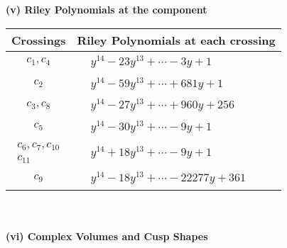 \documentclass[1p]{elsarticle_modified}
\theoremstyle{definition}
\begin{document}
\newpage\renewcommand{\arraystretch}{1}
\flushleft \textbf{(v) Riley Polynomials at the component}\newline \\
\begin{tabular}{m{50pt}|m{274pt}}
Crossings & \hspace{64pt}Riley Polynomials at each crossing \\
\hline $$\begin{aligned}c_{1},c_{4}\end{aligned}$$&$\begin{aligned}
&y^{14}-23 y^{13}+\cdots-3 y+1
\end{aligned}$\\
\hline $$\begin{aligned}c_{2}\end{aligned}$$&$\begin{aligned}
&y^{14}-59 y^{13}+\cdots+681 y+1
\end{aligned}$\\
\hline $$\begin{aligned}c_{3},c_{8}\end{aligned}$$&$\begin{aligned}
&y^{14}-27 y^{13}+\cdots+960 y+256
\end{aligned}$\\
\hline $$\begin{aligned}c_{5}\end{aligned}$$&$\begin{aligned}
&y^{14}-30 y^{13}+\cdots-9 y+1
\end{aligned}$\\
\hline $$\begin{aligned}c_{6},c_{7},c_{10}\\c_{11}\end{aligned}$$&$\begin{aligned}
&y^{14}+18 y^{13}+\cdots-9 y+1
\end{aligned}$\\
\hline $$\begin{aligned}c_{9}\end{aligned}$$&$\begin{aligned}
&y^{14}-18 y^{13}+\cdots-22277 y+361
\end{aligned}$\\
\hline
\end{tabular}\\~\\
\newpage\flushleft \textbf{(vi) Complex Volumes and Cusp Shapes}
\end{document}
